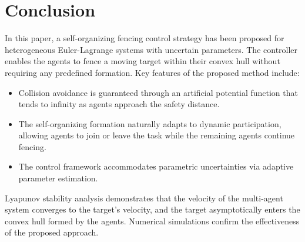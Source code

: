 \section{Conclusion}
\label{sec conclusion}

In this paper, a self-organizing fencing control strategy has been proposed for heterogeneous Euler-Lagrange systems with uncertain parameters.
The controller enables the agents to fence a moving target within their convex hull without requiring any predefined formation.
Key features of the proposed method include:
\begin{itemize}
    \item Collision avoidance is guaranteed through an artificial potential function that tends to infinity as agents approach the safety distance.
    \item The self-organizing formation naturally adapts to dynamic participation, allowing agents to join or leave the task while the remaining agents continue fencing.
    \item The control framework accommodates parametric uncertainties via adaptive parameter estimation.
\end{itemize}
Lyapunov stability analysis demonstrates that the velocity of the multi-agent system converges to the target's velocity, and the target asymptotically enters the convex hull formed by the agents.
Numerical simulations confirm the effectiveness of the proposed approach.